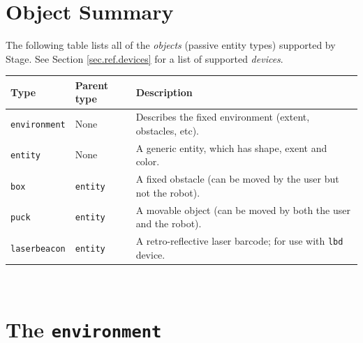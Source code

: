 \documentclass[11pt]{report}
\begin{document}
\newpage
\section{Object Summary}
\label{sec.ref.objects}

The following table lists all of the {\em objects} (passive entity
types) supported by Stage.  See Section \ref{sec.ref.devices} for a
list of supported {\em devices}.
\vspace{1em}\\\noindent
\begin{tabularx}{\columnwidth}{llX}
\hline 
Type & Parent type & Description \\
\hline 

\verb'environment' & None & Describes the fixed environment (extent,
obstacles, etc). \\

\verb'entity' & None & A generic entity, which has shape, exent and
color. \\

\hline

\verb'box' & \verb'entity' & A fixed obstacle (can be moved by the
user but not the robot). \\

\verb'puck' & \verb'entity' & A movable object (can be moved by both
the user and the robot).\\

\verb'laserbeacon' & \verb'entity' & A retro-reflective laser barcode;
for use with \verb'lbd' device.\\

\hline
\end{tabularx}
\vspace{1em}\\


\newpage
\section{The {\tt environment}}
\end{document}
